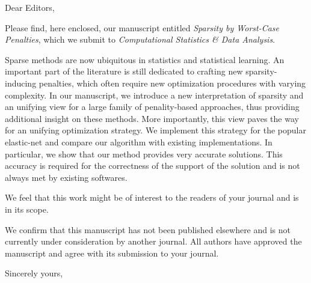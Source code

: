 \documentclass[a4paper,11pt,english]{letter}
\begin{document}
\begin{letter}

\signature{Julien Chiquet (on behalf of the authors) }

\opening{Dear Editors,}


Please find, here enclosed, our manuscript entitled \emph{Sparsity by
  Worst-Case Penalties}, which we submit to \textit{Computational
  Statistics \& Data Analysis}.

Sparse methods are now ubiquitous in statistics and statistical
learning. An important part of the literature is still dedicated to
crafting new sparsity-inducing penalties, which often require new
optimization procedures with varying complexity. In our manuscript, we
introduce a new interpretation of sparsity and an unifying view for a
large family of penality-based approaches, thus providing additional
insight on these methods. More importantly, this view paves the way
for an unifying optimization strategy. We implement this strategy for
the popular elastic-net and compare our algorithm with existing
implementations. In particular, we show that our method provides very
accurate solutions. This accuracy is required for the correctness
of the support of the solution and is not always met by existing
softwares.

We feel  that this work  might be of interest  to the readers  of your
journal and is in its scope.

We confirm that  this manuscript has not been  published elsewhere and
is not currently  under consideration by another  journal. All authors
have approved  the manuscript  and agree with  its submission  to your
journal.

\closing{Sincerely yours,}

\end{letter}
\end{document}
